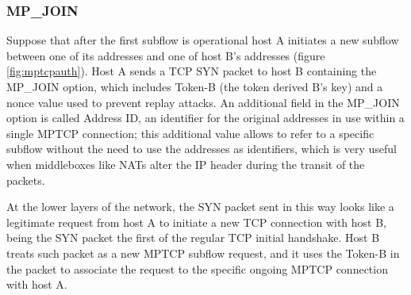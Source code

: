 \subsubsection{MP\_JOIN}
Suppose that after the first subflow is operational host A initiates a new subflow between one of its addresses and one of host B's addresses (figure \ref{fig:mptcpauth}). Host A sends a TCP SYN packet to host B containing the MP\_JOIN option, which includes Token-B (the token derived B's key) and a nonce value used to prevent replay attacks. An additional field in the MP\_JOIN option is called Address ID, an identifier for the original addresses in use within a single MPTCP connection; this additional value allows to refer to a specific subflow without the need to use the addresses as identifiers, which is very useful when middleboxes like NATs alter the IP header during the transit of the packets.

At the lower layers of the network, the SYN packet sent in this way looks like a legitimate request from host A to initiate a new TCP connection with host B, being the SYN packet the first of the regular TCP initial handshake. Host B treats such packet as a new MPTCP subflow request, and it uses the Token-B in the packet to associate the request to the specific ongoing MPTCP connection with host A.

